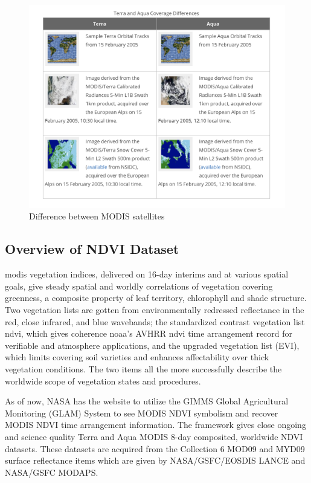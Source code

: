  \begin{figure}[H]
            \centering
            \includegraphics[width=1.0\linewidth]{figures/ch3/satellites.png}
            \caption{\label{fig:modis_satellites_difference} Difference between MODIS satellites \cite{NSIDC}}
    \end{figure}

\subsection{Overview of NDVI Dataset}

\gls{modis} vegetation indices, delivered on 16-day interims and at various spatial goals, give steady spatial and worldly correlations of vegetation covering greenness, a composite property of leaf territory, chlorophyll and shade structure. Two vegetation lists are gotten from environmentally redressed reflectance in the red, close infrared, and blue wavebands; the standardized contrast vegetation list \gls{ndvi}, which gives coherence \gls{noaa}'s AVHRR \gls{ndvi} time arrangement record for verifiable and atmosphere applications, and the upgraded vegetation list (EVI), which limits covering soil varieties and enhances affectability over thick vegetation conditions. The two items all the more successfully describe the worldwide scope of vegetation states and procedures. 

As of now, NASA has the website to utilize the GIMMS Global Agricultural Monitoring (GLAM) System to see MODIS NDVI symbolism and recover MODIS NDVI time arrangement information. The framework gives close ongoing and science quality Terra and Aqua MODIS 8-day composited, worldwide NDVI datasets. These datasets are acquired from the Collection 6 MOD09 and MYD09 surface reflectance items which are given by NASA/GSFC/EOSDIS LANCE and NASA/GSFC MODAPS.

